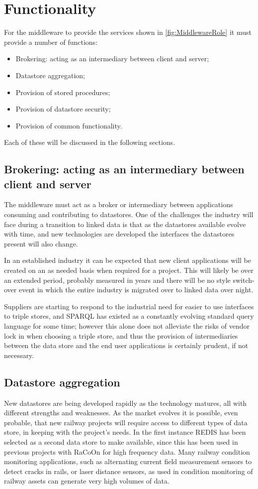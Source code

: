 \section{Functionality}
 \label{sec:function}
For the middleware to provide the services shown in \autoref{fig:MiddlewareRole} it must provide a number of functions:
\begin{itemize} 
    \item Brokering: acting as an intermediary between client and server;
    \item Datastore aggregation;
    \item Provision of stored procedures;
    \item Provision of datastore security;
    \item Provision of common functionality.
\end{itemize}

Each of these will be discussed in the following sections.

\subsection {Brokering: acting as an intermediary between client and server}
The middleware must act as a broker or intermediary between applications consuming and contributing to datastores. One of the challenges the industry will face during a transition to linked data is that as the datastores available evolve with time, and new technologies are developed the interfaces the datastores present will also change.

In an established industry it can be expected that new client applications will be created on an as needed basis when required for a project. This will likely be over an extended period, probably measured in years and there will be no  style switch-over event in which the entire industry is migrated over to linked data over night. 

Suppliers are starting to respond to the industrial need for easier to use interfaces to triple stores, and SPARQL has existed as a constantly evolving standard query language for some time; however this alone does not alleviate the risks of vendor lock in when choosing a triple store, and thus the provision of intermediaries between the data store and the end user applications is certainly prudent, if not necessary.

\subsection{Datastore aggregation}
New datastores are being developed rapidly as the technology matures, all with different strengths and weaknesses. As the market evolves it is possible, even probable, that new railway projects will require access to different types of data store, in keeping with the project's needs. In the first instance REDIS has been selected as a second data store to make available, since this has been used in previous projects with RaCoOn for high frequency data. Many railway condition monitoring applications, such as alternating current field measurement sensors to detect cracks in rails, or laser distance sensors, as used in condition monitoring of railway assets can generate very high volumes of data.
